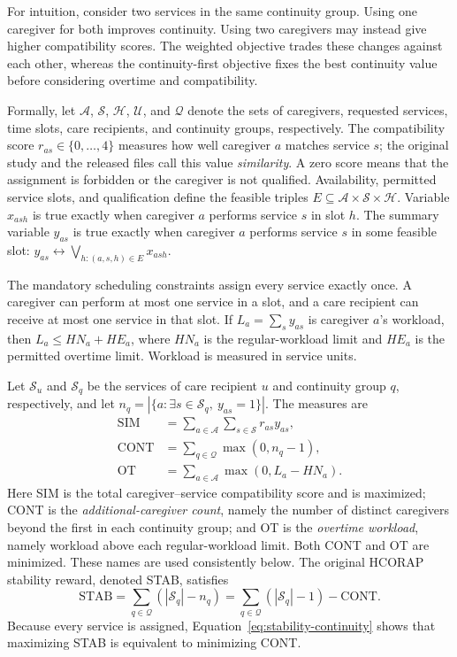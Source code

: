 \documentclass[sigconf,nonacm]{acmart}
\begin{document}
For intuition, consider two services in the same continuity group.  Using one
caregiver for both improves continuity.  Using two caregivers may instead give
higher compatibility scores.  The weighted objective trades these changes
against each other, whereas the continuity-first objective fixes the best
continuity value before considering overtime and compatibility.

Formally, let $\mathcal A$, $\mathcal S$, $\mathcal H$, $\mathcal U$, and
$\mathcal Q$ denote the sets of caregivers, requested services, time slots,
care recipients, and continuity groups, respectively.  The compatibility score
$r_{as}\in\{0,\ldots,4\}$ measures how well caregiver $a$ matches service $s$;
the original study and the released files call this value \emph{similarity}.
A zero score means that the assignment is forbidden or the caregiver is not
qualified.  Availability, permitted service slots, and qualification define
the feasible triples
$E\subseteq\mathcal A\times\mathcal S\times\mathcal H$.  Variable $x_{ash}$ is
true exactly when caregiver $a$ performs service $s$ in slot $h$.  The summary
variable $y_{as}$ is true exactly when caregiver $a$ performs service $s$ in
some feasible slot:
$y_{as}\leftrightarrow\bigvee_{h:(a,s,h)\in E}x_{ash}$.

The mandatory scheduling constraints assign every service exactly once.  A
caregiver can perform at most one service in a slot, and a care recipient can
receive at most one service in that slot.  If
$L_a=\sum_s y_{as}$ is caregiver $a$'s workload, then
$L_a\le HN_a+HE_a$, where $HN_a$ is the regular-workload limit and $HE_a$ is
the permitted overtime limit.  Workload is measured in service units.

Let $\mathcal S_u$ and $\mathcal S_q$ be the services of care recipient $u$ and
continuity group $q$, respectively, and let
$n_q=|\{a:\exists s\in\mathcal S_q,\ y_{as}=1\}|$.  The measures are
\begin{align}
  \mathrm{SIM}  &= \sum_{a\in\mathcal A}\sum_{s\in\mathcal S} r_{as}y_{as}, \\
  \mathrm{CONT} &= \sum_{q\in\mathcal Q}\max(0,n_q-1), \\
  \mathrm{OT}   &= \sum_{a\in\mathcal A}\max(0,L_a-HN_a).
\end{align}
Here SIM is the total caregiver--service compatibility score and is maximized;
CONT is the \emph{additional-caregiver count}, namely the number of distinct
caregivers beyond the first in each continuity group; and OT is the
\emph{overtime workload}, namely workload above each regular-workload limit.
Both CONT and OT are minimized.  These names are used consistently below.  The
original HCORAP stability reward, denoted STAB, satisfies
\begin{equation}
  \mathrm{STAB}
  = \sum_{q\in\mathcal Q}(|\mathcal S_q|-n_q)
  = \sum_{q\in\mathcal Q}(|\mathcal S_q|-1)-\mathrm{CONT}.
  \label{eq:stability-continuity}
\end{equation}
Because every service is assigned, Equation~\eqref{eq:stability-continuity}
shows that maximizing STAB is equivalent to minimizing CONT.
\end{document}
